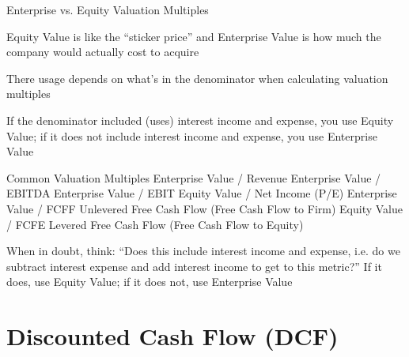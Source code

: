 \documentclass[10pt]{article}
\begin{document}
    \begin{core}{Enterprise vs. Equity Valuation Multiples}

      Equity Value is like the “sticker price” and Enterprise Value is how much the company would actually cost to acquire

      There usage depends on what’s in the denominator when calculating valuation multiples

      If the denominator included (uses) interest income and expense, you use Equity Value; if it does not include interest income and expense, you use Enterprise Value

      Common Valuation Multiples
      Enterprise Value / Revenue
      Enterprise Value / EBITDA
      Enterprise Value / EBIT
      Equity Value / Net Income (P/E)
      Enterprise Value / FCFF
      Unlevered Free Cash Flow (Free Cash Flow to Firm)
      Equity Value / FCFE
      Levered Free Cash Flow (Free Cash Flow to Equity)

      When in doubt, think: “Does this include interest income and expense, i.e. do we subtract interest expense and add interest income to get to this metric?”
      If it does, use Equity Value; if it does not, use Enterprise Value

    \end{core}

\section{Discounted Cash Flow (DCF)}
\end{document}
